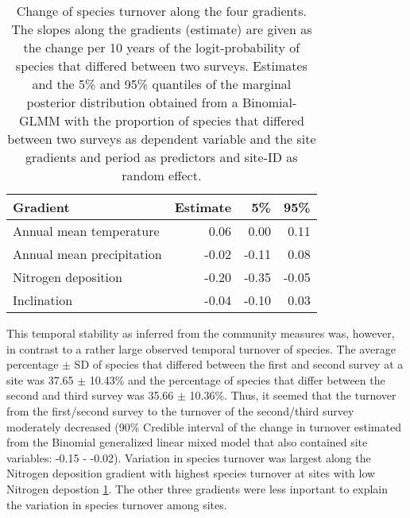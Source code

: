 \documentclass[fleqn,10pt,lineno]{wlpeerj} %
\theoremstyle{definition}
\theoremstyle{definition}
\theoremstyle{definition}
\theoremstyle{remark}
\begin{document}
\begin{table}

\caption{\label{tab:turnovertab}Change of species turnover along the four gradients. The slopes along the gradients (estimate) are given as the change per 10 years of the logit-probability of species that differed between two surveys. Estimates and the 5\% and 95\% quantiles of the marginal posterior distribution obtained from a Binomial-GLMM with the proportion of species that differed between two surveys as dependent variable and the site gradients and period as predictors and site-ID as random effect.}
\centering
\begin{tabular}[t]{lrrr}
\toprule
Gradient & Estimate & 5\% & 95\%\\
\midrule
Annual mean temperature & 0.06 & 0.00 & 0.11\\
Annual mean precipitation & -0.02 & -0.11 & 0.08\\
Nitrogen deposition & -0.20 & -0.35 & -0.05\\
Inclination & -0.04 & -0.10 & 0.03\\
\bottomrule
\end{tabular}
\end{table}

This temporal stability as inferred from the community measures was,
however, in contrast to a rather large observed temporal turnover of
species. The average percentage \(\pm\) SD of species that differed
between the first and second survey at a site was 37.65 \(\pm\) 10.43\%
and the percentage of species that differ between the second and third
survey was 35.66 \(\pm\) 10.36\%. Thus, it seemed that the turnover from
the first/second survey to the turnover of the second/third survey
moderately decreased (90\% Credible interval of the change in turnover
estimated from the Binomial generalized linear mixed model that also
contained site variables: -0.15 - -0.02). Variation in species turnover
was largest along the Nitrogen deposition gradient with highest species
turnover at sites with low Nitrogen depostion \ref{tab:turnovertab}. The
other three gradients were less inportant to explain the variation in
species turnover among sites.
\end{document}
